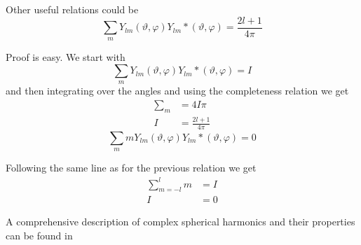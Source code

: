 \par{Other useful relations could be}
\begin{equation}
\sum_{m} Y_{lm}(\vartheta,\varphi)Y_{lm}{*}(\vartheta,\varphi)=\frac{2l+1}{4\pi}
\end{equation}
\par{Proof is easy. We start with}
\begin{equation}
\sum_{m} Y_{lm}(\vartheta,\varphi)Y_{lm}{*}(\vartheta,\varphi)=I
\end{equation}
and then integrating over the angles and using the completeness relation we get
\begin{equation}
\begin{split}
\sum_{m}&=4I\pi\\
I&=\frac{2l+1}{4\pi}
\end{split}
\end{equation} 
\begin{equation}
\sum_{m} mY_{lm}(\vartheta,\varphi)Y_{lm}{*}(\vartheta,\varphi)=0
\end{equation}
\par{Following the same line as for the previous relation we get}
\begin{equation}
\begin{split}
\sum_{m=-l}^{l} m&=I\\
I&=0
\end{split}
\end{equation}
\par{A comprehensive description of complex spherical harmonics and their
  properties can be found in \citep{Varshalovich88}} 
%
